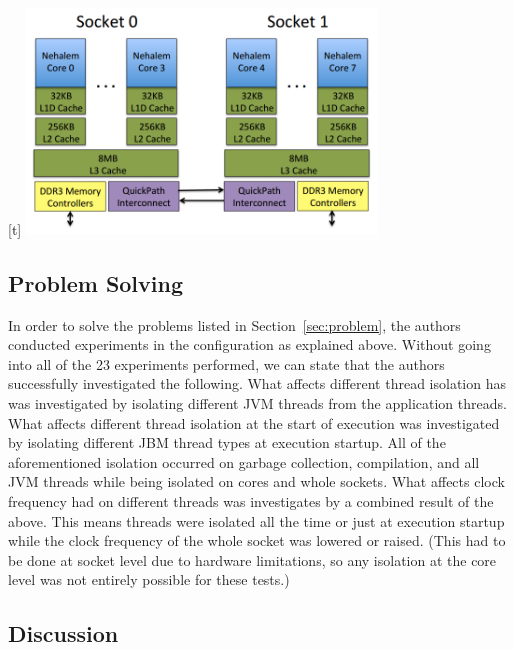\documentclass[conference]{IEEEtran}
\begin{document}
\begin{center}[t]
\includegraphics[height=60mm]{images/hardware}
\end{center}

\subsection{Problem Solving}

In order to solve the problems listed in Section~\ref{sec:problem}, the authors
conducted experiments in the configuration as explained above. Without going into all of the 23
experiments performed, we can state that the authors successfully investigated the following.
What affects different thread isolation has was investigated by isolating different JVM threads
from the application threads. What affects different thread isolation at the start of execution
was investigated by isolating different JBM thread types at execution startup. All of the
aforementioned isolation occurred on garbage collection, compilation, and all JVM threads
while being isolated on cores and whole sockets. What affects clock frequency had on different
threads was investigates by a combined result of the above. This means threads were isolated all
the time or just at execution startup while the clock frequency of the whole socket was lowered
or raised. (This had to be done at socket level due to hardware limitations, so any isolation
at the core level was not entirely possible for these tests.) 

\subsection {Discussion}
\end{document}
